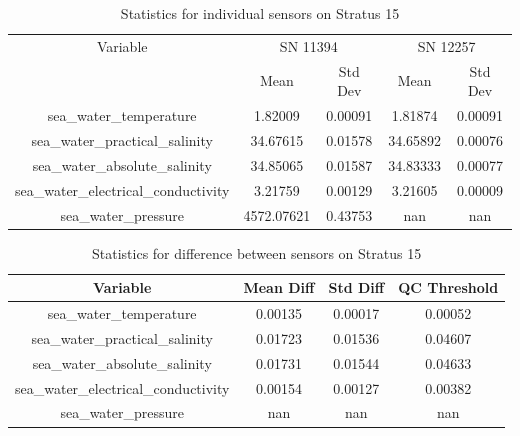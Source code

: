 \begin{table}[h]
\centering
\begin{tabular}{|c|c|c|c|c|}
\hline
Variable & \multicolumn{2}{c|}{SN 11394} & \multicolumn{2}{c|}{SN 12257} \\
& Mean & Std Dev & Mean & Std Dev \\
\hline
sea\_water\_temperature & 1.82009 & 0.00091 & 1.81874 & 0.00091 \\
sea\_water\_practical\_salinity & 34.67615 & 0.01578 & 34.65892 & 0.00076 \\
sea\_water\_absolute\_salinity & 34.85065 & 0.01587 & 34.83333 & 0.00077 \\
sea\_water\_electrical\_conductivity & 3.21759 & 0.00129 & 3.21605 & 0.00009 \\
sea\_water\_pressure & 4572.07621 & 0.43753 & nan & nan \\
\hline
\end{tabular}
\caption{Statistics for individual sensors on Stratus 15}
\end{table}

\begin{table}[h]
\centering
\begin{tabular}{|c|c|c|c|}
\hline
Variable & Mean Diff & Std Diff & QC Threshold \\
\hline
sea\_water\_temperature & 0.00135 & 0.00017 & 0.00052 \\
sea\_water\_practical\_salinity & 0.01723 & 0.01536 & 0.04607 \\
sea\_water\_absolute\_salinity & 0.01731 & 0.01544 & 0.04633 \\
sea\_water\_electrical\_conductivity & 0.00154 & 0.00127 & 0.00382 \\
sea\_water\_pressure & nan & nan & nan \\
\hline
\end{tabular}
\caption{Statistics for difference between sensors on Stratus 15}
\end{table}
